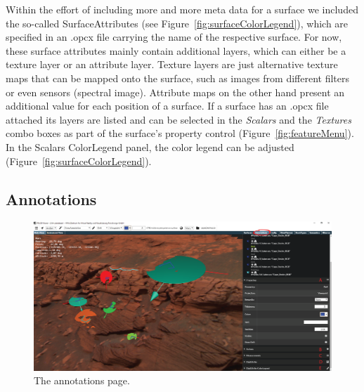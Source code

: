 Within the effort of including more and more meta data for a surface we included the so-called SurfaceAttributes (see Figure~\ref{fig:surfaceColorLegend}),
which are specified in an .opcx file carrying the name of the respective surface.
For now, these surface attributes mainly contain additional layers, which can either be a texture layer or an attribute layer.
Texture layers are just alternative texture maps that can be mapped onto the surface, such as images from different filters or even sensors (spectral image). 
Attribute maps on the other hand present an additional value for each position of a surface. 
If a surface has an .opcx file attached its layers are listed and can be selected in the \textit{Scalars} and the \textit{Textures} combo boxes as part of the surface's property control (Figure~\ref{fig:featureMenu}). 
In the Scalars ColorLegend panel, the color legend can be adjusted (Figure~\ref{fig:surfaceColorLegend}).

\newpage
\subsection{Annotations}
\label{sec:annotations}

\begin{figure}[h]
    	\centering
    		\includegraphics[width=1\textwidth]{pics/AnnotationsAI.png}
    	\caption[Viewer Features Annotations]{The annotations page.}
    	\label{fig:annoProps}
   \end{figure}
	
